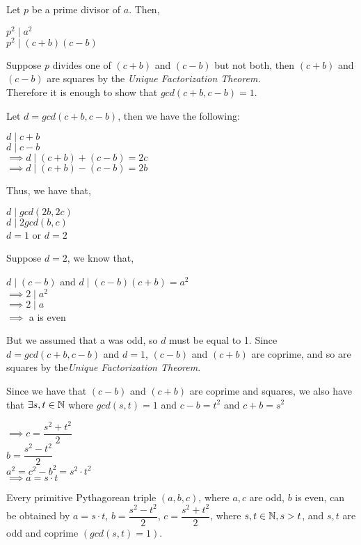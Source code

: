 \documentclass[main.tex]{subfiles}
\begin{document}
\begin{pf}
    Let $p$ be a prime divisor of $a$. Then, 
    \begin{center}
        $p^2 \mid a^2$ \\
        $p^2 \mid (c + b)(c - b)$
    \end{center}

    Suppose $p$ divides one of $(c + b)$ and $(c - b)$ but not both, then $(c + b)$ and $(c - b)$ are squares by the \textit{Unique Factorization Theorem.} \\ 
    Therefore it is enough to show that $gcd(c + b, c - b) = 1$.
    
    Let $d = gcd(c + b, c - b)$, then we have the following:
    \begin{center}
        $d \mid c + b$ \\
        $d \mid c - b$ \\
        $\implies d \mid (c + b) + (c - b) = 2c$ \\
        $\implies d \mid (c + b) - (c - b) = 2b$ \\
    \end{center}
\end{pf}
\begin{pf}[Cont.]
    Thus, we have that,
    \begin{center}
        $d \mid gcd(2b, 2c)$ \\
        $d \mid 2gcd(b, c)$ \\
        $d = 1$ or $d = 2$
    \end{center}
    Suppose $d = 2$, we know that,
    \begin{center}
        $d \mid (c-b)$ and $d \mid (c-b)(c+b) = a^2$ \\
        $\implies 2 \mid a^2$ \\
        $\implies 2 \mid a$ \\
        $\implies$ a is even
    \end{center}
    But we assumed that a was odd, so $d$ must be equal to 1. Since $d=gcd(c+b,c-b)$ and $d=1$, $(c-b)$ and $(c+b)$ are coprime, and so are squares by the\textit{Unique Factorization Theorem}.  
\end{pf}
Since we have that $(c-b)$ and $(c+b)$ are coprime and squares, we also have that $\exists s, t \in \mathbb{N}$ where $gcd(s,t)=1$ and $c-b = t^2$ and $c+b = s^2$
\begin{center}
    $\implies c = \dfrac{s^2+t^2}{2}$ \\
    $b = \dfrac{s^2-t^2}{2}$ \\
    $a^2 = c^2 - b^2 = s^2 \cdot t^2$ \\
    $\implies a = s \cdot t$
\end{center}
\begin{thm}
    Every primitive Pythagorean triple $(a,b,c)$, where $a,c$ are odd, $b$ is even, can be obtained by $a=s \cdot t$, $b=\dfrac{s^2 - t^2}{2}$, $c=\dfrac{s^2 + t^2}{2}$, where $s,t \in \mathbb{N}, s > t$, and $s,t$ are odd and coprime $(gcd(s,t)=1)$.
\end{thm}
\end{document}
